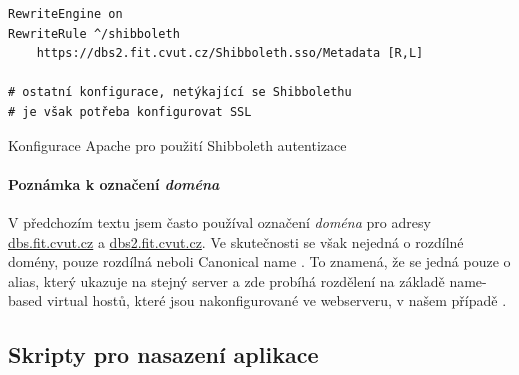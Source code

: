 \begin{listing}
	\expandafter\def\csname PY@tok@err\endcsname{} %
	\begin{verbatim}
RewriteEngine on
RewriteRule ^/shibboleth
    https://dbs2.fit.cvut.cz/Shibboleth.sso/Metadata [R,L] 

# ostatní konfigurace, netýkající se Shibbolethu
# je však potřeba konfigurovat SSL
	\end{verbatim}
	\caption{Konfigurace Apache pro použití Shibboleth autentizace} \label{code:apache-shibboleth}
\end{listing}

\paragraph{Poznámka k označení \emph{doména}}
V předchozím textu jsem často používal označení \emph{doména} pro adresy \url{dbs.fit.cvut.cz} a \url{dbs2.fit.cvut.cz}. Ve skutečnosti se však nejedná o rozdílné domény, pouze rozdílná  neboli Canonical name \cite{dns}. To znamená, že se jedná pouze o alias, který ukazuje na stejný server a zde probíhá rozdělení na základě name-based virtual hostů, které jsou nakonfigurované ve webserveru, v našem případě .

\subsection{Skripty pro nasazení aplikace} \label{app:deploy_script}

